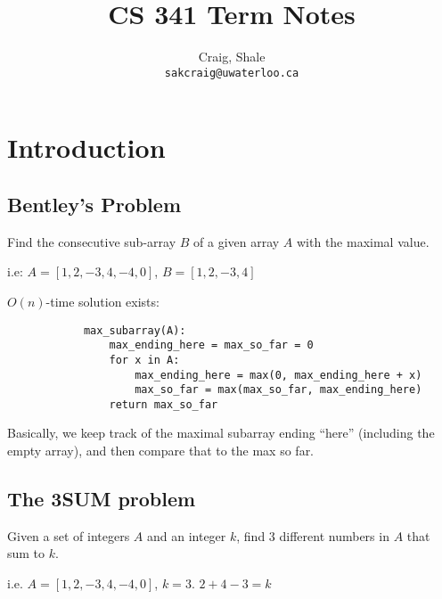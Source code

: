 \ifdefined\isphone
  
\else
  
\fi




\title{CS 341 Term Notes}

\author{
    Craig, Shale\\
    \texttt{sakcraig@uwaterloo.ca}
}
\maketitle

\tableofcontents

\chapter{Introduction}
    \section{Bentley's Problem}

        Find the consecutive sub-array $B$ of a given array $A$ with the maximal
        value.

        i.e: $A = [1, 2, -3, 4, -4, 0]$, $B = [1, 2, -3, 4]$

        $O(n)$-time solution exists:
        \begin{verbatim}
            max_subarray(A):
                max_ending_here = max_so_far = 0
                for x in A:
                    max_ending_here = max(0, max_ending_here + x)
                    max_so_far = max(max_so_far, max_ending_here)
                return max_so_far
        \end{verbatim}

        Basically, we keep track of the maximal subarray ending ``here''
        (including the empty array), and then compare that to the max so far.

    \section{The 3SUM problem}
        Given a set of integers $A$ and an integer $k$, find $3$ different
        numbers in $A$ that sum to $k$.

        i.e. $A = [1, 2, -3, 4, -4, 0]$, $k = 3$. $2 + 4 - 3 = k$

